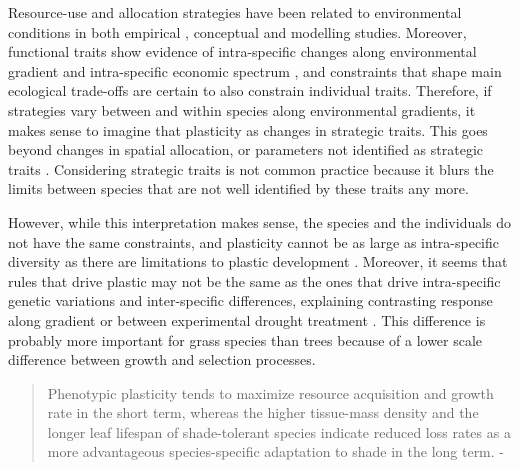 Resource-use and allocation strategies have been related to environmental conditions in both empirical \parencite{wright_leaves_2002, ackerly_functional_2004, poorter_leaf_2006}, conceptual \parencite{grime_evidence_1977, westoby_leaf-height-seed_1998} and modelling\parencite{kleidon_global_2000, scheiter_impacts_2009, reineking_environmental_2006} studies. Moreover, functional traits show evidence of intra-specific changes along environmental gradient \parencite{kichenin_contrasting_2013} and intra-specific economic spectrum \parencite{hu_novel_2015}, and constraints that shape main ecological trade-offs are certain to also constrain individual traits. Therefore, if strategies vary between and within species along environmental gradients, it makes sense to imagine that plasticity as changes in strategic traits. This goes beyond changes in spatial allocation\parencite{schapendonk_lingra_1998}, or parameters not identified as strategic traits \cite{lohier_explaining_2014, feller_mathematical_2015}. Considering strategic traits is not common practice because it blurs the limits between species that are not well identified by these traits any more.

However, while this interpretation makes sense, the species and the individuals do not have the same constraints, and plasticity cannot be as large as intra-specific diversity as there are limitations to plastic development \parencite{dewitt_costs_1998, auld_re-evaluating_2009}. Moreover, it seems that rules that drive plastic may not be the same as the ones that drive intra-specific genetic variations  and inter-specific differences\parencite{ryser_consequences_2000}, explaining contrasting response along gradient or between experimental drought treatment \parencite{kichenin_contrasting_2013, jung_intraspecific_2014}. This difference is probably more important for grass species than trees \parencite{franklin_modeling_2012} because of a lower scale difference between growth and selection processes.

\begin{quotation}
Phenotypic plasticity tends to maximize resource acquisition and growth rate in the short term, whereas the higher tissue-mass density and the longer leaf lifespan of shade-tolerant species indicate reduced loss rates as a more advantageous species-specific adaptation to shade in the long term. - \cite{ryser_consequences_2000}
\end{quotation}




